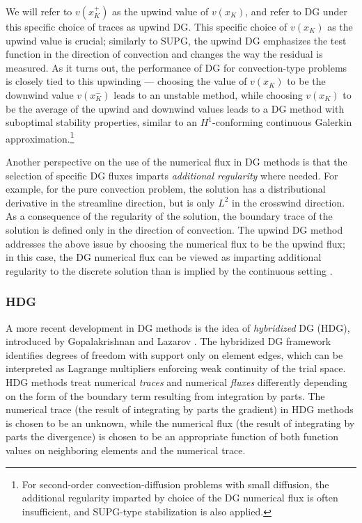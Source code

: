 We will refer to $v(x_K^+)$ as the upwind value of $v(x_K)$, and refer to DG under this specific choice of traces as upwind DG.  This specific choice of $v(x_K)$ as the upwind value is crucial; similarly to SUPG, the upwind DG emphasizes the test function in the direction of convection and changes the way the residual is measured.  As it turns out, the performance of DG for convection-type problems is closely tied to this upwinding --- choosing the value of $v(x_K)$ to be the downwind value $v(x_K^-)$ leads to an unstable method, while choosing $v(x_K)$ to be the average of the upwind and downwind values leads to a DG method with suboptimal stability properties, similar to an $H^1$-conforming continuous Galerkin approximation\cite{Brezzi20063293}.\footnote{For second-order convection-diffusion problems with small diffusion, the additional regularity imparted by choice of the DG numerical flux is often insufficient, and SUPG-type stabilization is also applied.}

Another perspective on the use of the numerical flux in DG methods is that the selection of specific DG fluxes imparts \emph{additional regularity} where needed.  For example, for the pure convection problem, the solution has a distributional derivative in the streamline direction, but is only $L^2$ in the crosswind direction. As a consequence of the regularity of the solution, the boundary trace of the solution is defined only in the direction of convection. The upwind DG method addresses the above issue by choosing the numerical flux to be the upwind flux; in this case, the DG numerical flux can be viewed as imparting additional regularity to the discrete solution than is implied by the continuous setting \cite{DPG1,DPG3}.  

\subsubsection{HDG}

A more recent development in DG methods is the idea of \emph{hybridized} DG (HDG), introduced by Gopalakrishnan and Lazarov \cite{hybridDG}. The hybridized DG framework identifies degrees of freedom with support only on element edges, which can be interpreted as Lagrange multipliers enforcing weak continuity of the trial space. HDG methods treat numerical \emph{traces} and numerical \emph{fluxes} differently depending on the form of the boundary term resulting from integration by parts. The numerical trace (the result of integrating by parts the gradient) in HDG methods is chosen to be an unknown, while the numerical flux (the result of integrating by parts the divergence) is chosen to be an appropriate function of both function values on neighboring elements and the numerical trace. 

